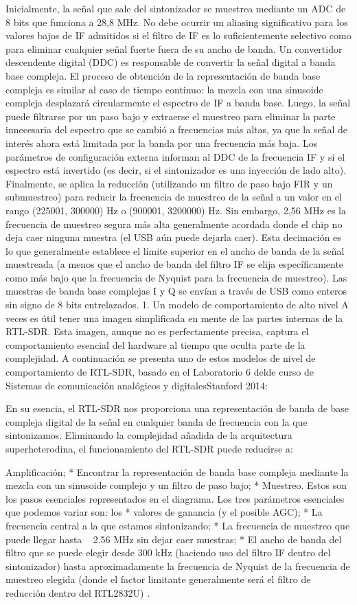 Inicialmente, la señal que sale del sintonizador se muestrea mediante un ADC de 8 bits que funciona a 28,8 MHz. No debe ocurrir un aliasing significativo para los valores bajos de IF admitidos si el filtro de IF es lo suficientemente selectivo como para eliminar cualquier señal fuerte fuera de su ancho de banda.
Un convertidor descendente digital (DDC) es responsable de convertir la señal digital a banda base compleja. El proceso de obtención de la representación de banda base compleja es similar al caso de tiempo continuo: la mezcla con una sinusoide compleja desplazará circularmente el espectro de IF a banda base. Luego, la señal puede filtrarse por un paso bajo y extraerse el muestreo para eliminar la parte innecesaria del espectro que se cambió a frecuencias más altas, ya que la señal de interés ahora está limitada por la banda por una frecuencia más baja. Los parámetros de configuración externa informan al DDC de la frecuencia IF y si el espectro está invertido (es decir, si el sintonizador es una inyección de lado alto).
Finalmente, se aplica la reducción (utilizando un filtro de paso bajo FIR y un submuestreo) para reducir la frecuencia de muestreo de la señal a un valor en el rango (225001, 300000) Hz o (900001, 3200000) Hz. Sin embargo, 2,56 MHz es la frecuencia de muestreo segura más alta generalmente acordada donde el chip no deja caer ninguna muestra (el USB aún puede dejarla caer). Esta decimación es lo que generalmente establece el límite superior en el ancho de banda de la señal muestreada (a menos que el ancho de banda del filtro IF se elija específicamente como más bajo que la frecuencia de Nyquist para la frecuencia de muestreo).
Las muestras de banda base complejas I y Q se envían a través de USB como enteros sin signo de 8 bits entrelazados.
   1. Un modelo de comportamiento de alto nivel
A veces es útil tener una imagen simplificada en mente de las partes internas de la RTL-SDR. Esta imagen, aunque no es perfectamente precisa, captura el comportamiento esencial del hardware al tiempo que oculta parte de la complejidad. A continuación se presenta uno de estos modelos de nivel de comportamiento de RTL-SDR, basado en el Laboratorio 6 delde curso de Sistemas de comunicación analógicos y digitalesStanford 2014:
   
En su esencia, el RTL-SDR nos proporciona una representación de banda de base compleja digital de la señal en cualquier banda de frecuencia con la que sintonizamos. Eliminando la complejidad añadida de la arquitectura superheterodina, el funcionamiento del RTL-SDR puede reducirse a:


Amplificación; 
* Encontrar la representación de banda base compleja mediante la mezcla con un sinusoide complejo y un filtro de paso bajo; 
* Muestreo. 
Estos son los pasos esenciales representados en el diagrama. Los tres parámetros esenciales que podemos variar son: los
* valores de ganancia (y el posible AGC); 
* La frecuencia central a la que estamos sintonizando; 
* La frecuencia de muestreo que puede llegar hasta ~ 2.56 MHz sin dejar caer muestras; 
* El ancho de banda del filtro que se puede elegir desde 300 kHz (haciendo uso del filtro IF dentro del sintonizador) hasta aproximadamente la frecuencia de Nyquist de la frecuencia de muestreo elegida (donde el factor limitante generalmente será el filtro de reducción dentro del RTL2832U) .